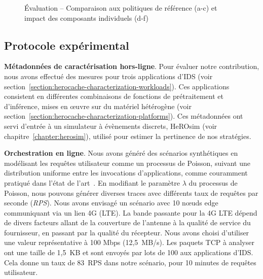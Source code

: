 \begin{figure}[t]
{    }
    \caption{Évaluation -- Comparaison aux politiques de référence (a-c) et impact des composants individuels (d-f)}
    \label{figure:herocache-evaluation}
\end{figure}

\subsection{Protocole expérimental}

\textbf{Métadonnées de caractérisation hors-ligne}. Pour évaluer notre contribution, nous avons effectué des mesures pour trois applications d'IDS (voir section~\ref{section:herocache-characterization-workloads}). Ces applications consistent en différentes combinaisons de fonctions de prétraitement et d'inférence, mises en œuvre sur du matériel hétérogène (voir section~\ref{section:herocache-characterization-platforms}). Ces métadonnées ont servi d'entrée à un simulateur à évènements discrets, HeROsim (voir chapitre~\ref{chapter:herosim}), utilisé pour estimer la pertinence de nos stratégies.

\textbf{Orchestration en ligne}. Nous avons généré des scénarios synthétiques en modélisant les requêtes utilisateur comme un processus de Poisson, suivant une distribution uniforme entre les invocations d'applications, comme couramment pratiqué dans l'état de l'art~\cite{9928755}. En modifiant le paramètre $\lambda$ du processus de Poisson, nous pouvons générer diverses traces avec différents taux de requêtes par seconde (\textit{RPS}). Nous avons envisagé un scénario avec 10 nœuds edge communiquant via un lien 4G (LTE). La bande passante pour la 4G LTE dépend de divers facteurs allant de la couverture de l'antenne à la qualité de service du fournisseur, en passant par la qualité du récepteur. Nous avons choisi d'utiliser une valeur représentative à 100 Mbps (12,5~MB/s). Les paquets \gls{TCP} à analyser ont une taille de 1,5~KB et sont envoyés par lots de 100 aux applications d'IDS. Cela donne un taux de 83~RPS dans notre scénario, pour 10 minutes de requêtes utilisateur.

